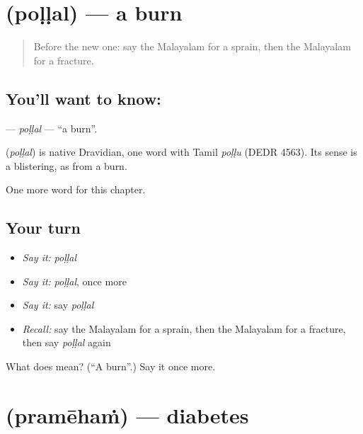 \section[\texorpdfstring{\ml{പൊള്ളൽ} (poḷḷal)}{പൊള്ളൽ (poḷḷal)}]{ (poḷḷal) — a burn}

\label{lesson:ML-C274-pollal}



\begin{quote}
Before the new one: say the Malayalam for a sprain, then the Malayalam for a fracture.
\end{quote}

\subsection*{You'll want to know: }
\textbf{} — \emph{poḷḷal} — \textquotedblleft{}a burn\textquotedblright{}.

\begin{cousinweb}
\textbf{} (\emph{poḷḷal}) is native Dravidian, one word with Tamil \emph{poḷḷu} (DEDR 4563). Its sense is a blistering, as from a burn.
\end{cousinweb}

\begin{grammarlens}[title={What you've built}]
One more word for this chapter.
\end{grammarlens}

\subsection*{Your turn}
\begin{itemize}
\raggedright
  \item \emph{Say it:} \emph{poḷḷal}
  \item \emph{Say it:} \emph{poḷḷal}, once more
  \item \emph{Say it:} say \emph{poḷḷal}
  \item \emph{Recall:} say the Malayalam for a sprain, then the Malayalam for a fracture, then say \emph{poḷḷal} again
\end{itemize}

\begin{tcolorbox}[breakable,colback=teal!4,colframe=teal!35!black,title={Before you move on}]
What does  mean? (\textquotedblleft{}A burn\textquotedblright{}.) Say it once more.
\end{tcolorbox}
\section[\texorpdfstring{\ml{പ്രമേഹം} (pramēhaṁ)}{പ്രമേഹം (pramēhaṁ)}]{ (pramēhaṁ) — diabetes}

